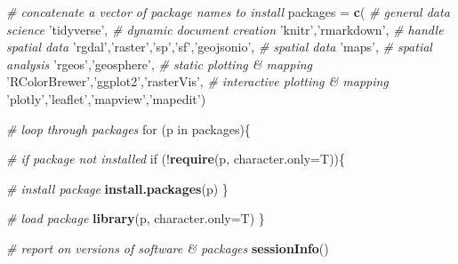 \documentclass[]{book}
\newenvironment{Shaded}{\begin{snugshade}}{\end{snugshade}}
\newcommand{\KeywordTok}[1]{\textcolor[rgb]{0.13,0.29,0.53}{\textbf{{#1}}}}
\newcommand{\DataTypeTok}[1]{\textcolor[rgb]{0.13,0.29,0.53}{{#1}}}
\newcommand{\StringTok}[1]{\textcolor[rgb]{0.31,0.60,0.02}{{#1}}}
\newcommand{\CommentTok}[1]{\textcolor[rgb]{0.56,0.35,0.01}{\textit{{#1}}}}
\newcommand{\NormalTok}[1]{{#1}}
\theoremstyle{definition}
\theoremstyle{definition}
\theoremstyle{definition}
\theoremstyle{remark}
\begin{document}
\begin{Shaded}
\begin{Highlighting}[]
\CommentTok{# concatenate a vector of package names to install}
\NormalTok{packages =}\StringTok{ }\KeywordTok{c}\NormalTok{(}
  \CommentTok{# general data science}
  \StringTok{'tidyverse'}\NormalTok{,}
  \CommentTok{# dynamic document creation}
  \StringTok{'knitr'}\NormalTok{,}\StringTok{'rmarkdown'}\NormalTok{,}
  \CommentTok{# handle spatial data}
  \StringTok{'rgdal'}\NormalTok{,}\StringTok{'raster'}\NormalTok{,}\StringTok{'sp'}\NormalTok{,}\StringTok{'sf'}\NormalTok{,}\StringTok{'geojsonio'}\NormalTok{,}
  \CommentTok{# spatial data}
  \StringTok{'maps'}\NormalTok{,}
  \CommentTok{# spatial analysis}
  \StringTok{'rgeos'}\NormalTok{,}\StringTok{'geosphere'}\NormalTok{,}
  \CommentTok{# static plotting & mapping}
  \StringTok{'RColorBrewer'}\NormalTok{,}\StringTok{'ggplot2'}\NormalTok{,}\StringTok{'rasterVis'}\NormalTok{,}
  \CommentTok{# interactive plotting & mapping}
  \StringTok{'plotly'}\NormalTok{,}\StringTok{'leaflet'}\NormalTok{,}\StringTok{'mapview'}\NormalTok{,}\StringTok{'mapedit'}\NormalTok{)}

\CommentTok{# loop through packages}
\NormalTok{for (p in packages)\{}
  
  \CommentTok{# if package not installed}
  \NormalTok{if (!}\KeywordTok{require}\NormalTok{(p, }\DataTypeTok{character.only=}\NormalTok{T))\{}
    
    \CommentTok{# install package}
    \KeywordTok{install.packages}\NormalTok{(p)}
  \NormalTok{\}}
  
  \CommentTok{# load package}
  \KeywordTok{library}\NormalTok{(p, }\DataTypeTok{character.only=}\NormalTok{T)}
\NormalTok{\}}

\CommentTok{# report on versions of software & packages}
\KeywordTok{sessionInfo}\NormalTok{()}
\end{Highlighting}
\end{Shaded}
\end{document}
